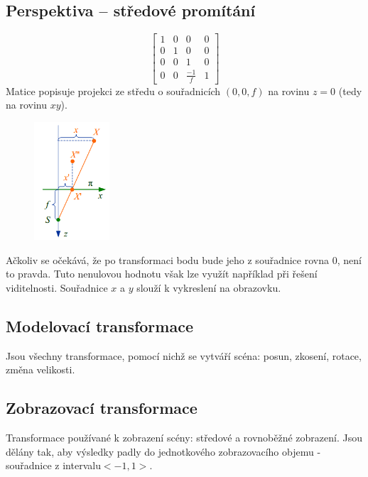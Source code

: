\subsection{Perspektiva -- středové promítání}
\begin{equation*}
			 \begin{bmatrix}
			     1 & 0 & 0 & 0       \\[0.3em]
    			 0 & 1 & 0 & 0       \\[0.3em]
     			 0 & 0 & 1 & 0 	\\[0.3em]
     			 0 & 0 & \frac{-1}{f} & 1       
			  \end{bmatrix}
		\end{equation*}
Matice popisuje projekci ze středu o souřadnicích $(0, 0, f)$ na rovinu $z = 0$ (tedy na rovinu  $xy$).
\begin{figure}[H]
\centering
\includegraphics[width=0.25\textwidth]{assets/2_stredove_promitani}
\end{figure}
Ačkoliv se očekává, že po transformaci bodu bude jeho z souřadnice rovna $0$, není to pravda. Tuto nenulovou hodnotu však lze využít například při řešení viditelnosti. Souřadnice $x$ a $y$ slouží k vykreslení na obrazovku.
\subsection{Modelovací transformace}
Jsou všechny transformace, pomocí nichž se vytváří scéna: posun, zkosení, rotace, změna velikosti.

\subsection{Zobrazovací transformace}
Transformace používané k zobrazení scény: středové a rovnoběžné zobrazení. Jsou dělány tak, aby výsledky padly do jednotkového zobrazovacího objemu - souřadnice z intervalu$ <-1, 1>$. 